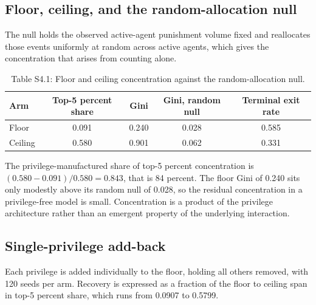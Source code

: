 \documentclass[12pt]{article}
\begin{document}
\subsection{Floor, ceiling, and the random-allocation null}

The null holds the observed active-agent punishment volume fixed and reallocates
those events uniformly at random across active agents, which gives the
concentration that arises from counting alone.

\begin{table}[htbp]
\centering
\small
\caption{Table S4.1: Floor and ceiling concentration against the random-allocation null.}
\begin{tabular}{lcccc}
\toprule
Arm & Top-5 percent share & Gini & Gini, random null & Terminal exit rate \\
\midrule
Floor & 0.091 & 0.240 & 0.028 & 0.585 \\
Ceiling & 0.580 & 0.901 & 0.062 & 0.331 \\
\bottomrule
\end{tabular}
\end{table}

The privilege-manufactured share of top-5 percent concentration is
$(0.580 - 0.091)/0.580 = 0.843$, that is 84 percent. The floor Gini of 0.240 sits
only modestly above its random null of 0.028, so the residual concentration in a
privilege-free model is small. Concentration is a product of the privilege
architecture rather than an emergent property of the underlying interaction.

\subsection{Single-privilege add-back}

Each privilege is added individually to the floor, holding all others removed,
with 120 seeds per arm. Recovery is expressed as a fraction of the floor to
ceiling span in top-5 percent share, which runs from 0.0907 to 0.5799.
\end{document}
